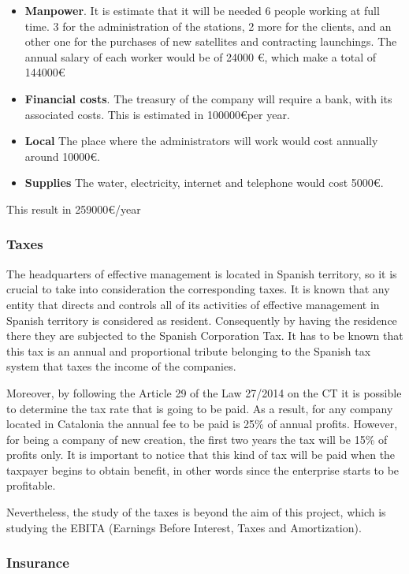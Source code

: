 \begin{itemize}
\item \textbf{Manpower}. It is estimate that it will be needed 6 people working at full time. 3 for the administration of the stations, 2 more for the clients, and an other one for the purchases of new satellites and contracting launchings. The annual salary of each worker would be of 24000 \euro, which make a total of 144000\euro
\item \textbf{Financial costs}. The treasury of the company will require a  bank, with its associated costs. This is estimated in 100000\euro  per year.
\item \textbf{Local} The place where the administrators will work would cost annually around 10000\euro .
\item \textbf{Supplies} The water, electricity, internet and telephone would cost 5000\euro .
\end{itemize}

This result in 259000\euro/year
\subsubsection{Taxes}
The headquarters of effective management is located in Spanish territory, so it is crucial to take into consideration the corresponding taxes. It is known that any entity that directs and controls all of its activities of effective management in Spanish territory is considered as resident. Consequently by having the residence there they are subjected to the Spanish Corporation Tax. It has to be known that this tax is an annual and proportional tribute belonging to the Spanish tax system that taxes the income of the companies.

Moreover, by following the Article 29 of the Law 27/2014 on the CT it is possible to determine the tax rate that is going to be paid. As a result, for any company located in Catalonia the annual fee to be paid is 25\% of annual profits. However, for being a company of new creation, the first two years the tax will be 15\% of profits only. It is important to notice that this kind of tax will be paid when the taxpayer begins to obtain benefit, in other words since the enterprise starts to be profitable. 

Nevertheless, the study of the taxes is beyond the aim of this project, which is studying the EBITA (Earnings Before Interest, Taxes and Amortization).  
\subsubsection{Insurance}


